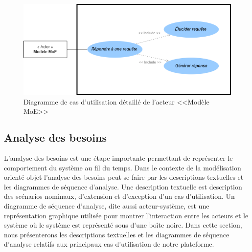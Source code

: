 \begin{figure}[H]
    \centering
    \includegraphics[width=\textwidth,height=0.3\textheight]{images/chp3/fig5.png}
    \caption{Diagramme de cas d’utilisation détaillé de l’acteur <<Modèle MoE>>}
    \label{fig: Diagramme de cas d’utilisation détaillé de l’acteur <<Modèle MoE>>>}    
\end{figure}

\subsection{Analyse des besoins}
L'analyse des besoins est une étape importante permettant de représenter le comportement du système au fil du temps. Dans le contexte de la modélisation orienté objet l’analyse des besoins peut se faire par les descriptions textuelles et les diagrammes de séquence d'analyse. Une description textuelle est description des scénarios nominaux, d'extension et d'exception d’un cas d'utilisation. Un diagramme de séquence d'analyse, dite aussi acteur-système, est une représentation graphique utilisée pour montrer l’interaction entre les acteurs et le système où le système est représenté sous d'une boîte noire. Dans cette section, nous présenterons les descriptions textuelles et les diagrammes de séquence d'analyse relatifs aux principaux cas d’utilisation de notre plateforme.

